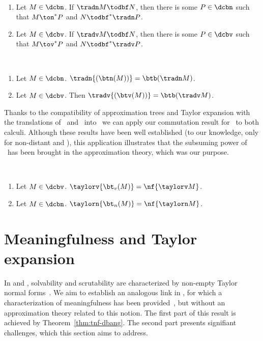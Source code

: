 \begin{lemma}[Embedding]~\label{lem:trad_embedding}
	\begin{enumerate}
		\item Let $M\in\dcbn$. If $\tradn M\todbf N$, then there is some
			$P\in\dcbn$ such that $M\ton^* P$ and $N\todbf^*\tradn
			P$.
		\item Let $M\in\dcbv$. If $\tradv M\todbf N$, then there is some
			$P\in\dcbv$ such that $M\tov^* P$ and $N\todbf^*\tradv
			P$.
	\end{enumerate}
\end{lemma}



\begin{theorem}~\label{thm:bohm-trad}
	\begin{enumerate}
		\item Let $M\in \dcbn$. $\tradn{(\btn(M))} = \btb(\tradn M)$.
		\item Let $M\in\dcbv$. Then $\tradv{(\btv(M))} = \btb(\tradv M)$.
	\end{enumerate}
\end{theorem}


Thanks to the compatibility of approximation trees and Taylor expansion with the
translations of \dcbn\ and \dcbv\ into \dbang\, we can
apply our commutation result for \dbang\ to both calculi. Although these results
have been well established (to our knowledge, only for non-distant \cbn{}
and \cbv{}), this application illustrates
 that the subsuming power of \dbang\ has been brought in the
approximation theory, which was our purpose. 

\begin{theorem}~
	\label{commutation-thm-translations}
	\begin{enumerate}
		\item Let $M\in\dcbv$. $\taylorv{\bt_v(M)}=\nf{\taylorv M}$.
		\item Let $M\in\dcbn$. $\taylorn{\bt_n(M)}=\nf{\taylorn M}$.
	\end{enumerate}
\end{theorem}



\section{Meaningfulness and Taylor expansion}\label{sec:meaningfulness}
In \cbn{} and \cbv{}, solvability and scrutability are characterized by non-empty Taylor normal forms~\cite{ER08,CG14}.
We aim to establish an analogous link in \dbang, for which a characterization of
meaningfulness has been provided~\cite{kag24}, but without an approximation theory related
to this notion. The first part of this result is achieved by
Theorem~\ref{thm:tnf-dbang}. The
second part presents signifiant challenges, which  this section aims to
address. 


